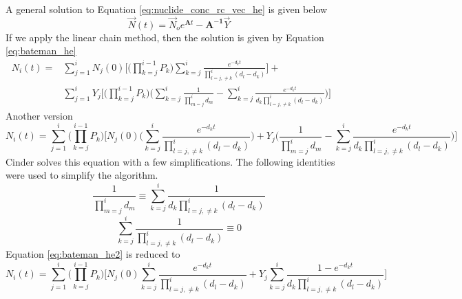 A general solution to Equation \ref{eq:nuclide_conc_rc_vec_he} is given below
\begin{equation}\label{eq:rate_change_sol_he}
  \vec{N}(t) =\vec{N}_{o} e^{\boldsymbol{A}t }- \boldsymbol{A^{-1}} \vec{Y}
\end{equation}
If we apply the linear chain method, then the solution is given by Equation
\ref{eq:bateman_he}
\begin{equation}\label{eq:bateman_he}
  \begin{aligned}
  N_{i}(t) = &\sum_{j=1}^{i} N_{j}(0)
  \Bigg[ \Bigg( \prod_{k=j}^{i-1} P_{k} \Bigg)
  \sum_{k=j}^{i}\frac{e^{-d_{k}t}}{\displaystyle \prod_{l=j, \neq k}^{i}
  (d_{l} -d_{k})}
  \Bigg] + &&\\
  &\sum_{j=1}^{i} Y_{j} \Bigg[ \Bigg(\prod_{k=j}^{i-1} P_{k} \Bigg)
  \Bigg(\sum_{k=j}^{i} \frac{1}{\displaystyle \prod_{m=j}^{i} d_{m}} -
  \sum_{k=j}^{i} \frac{e^{-d_{k}t}}{d_{k} \displaystyle \prod_{l=j, \neq k}^{i}(d_{l} -d_{k})}
  \Bigg)\Bigg]
  \end{aligned}
\end{equation}
Another version
\begin{equation}\label{eq:bateman_he_2}
  N_{i}(t) = \sum_{j=1}^{i}
  \Bigg( \prod_{k=j}^{i-1} P_{k} \Bigg)
  \Bigg[ N_{j}(0) \Bigg(\sum_{k=j}^{i}\frac{e^{-d_{k}t}}{\displaystyle
  \prod_{l=j, \neq k}^{i}(d_{l} -d_{k})}
  \Bigg) + Y_{j}
  \Bigg( \frac{1}{\displaystyle \prod_{m=j}^{i} d_{m}} -
  \sum_{k=j}^{i} \frac{e^{-d_{k}t}}{d_{k}
  \displaystyle \prod_{l=j, \neq k}^{i}(d_{l} -d_{k})}
  \Bigg)\Bigg]
\end{equation}
Cinder solves this equation with a few simplifications. The following identities were used to
simplify the algorithm.
\begin{equation}\label{eq:simplification1}
  \frac{1}{\displaystyle \prod_{m=j}^{i} d_{m}} \equiv
  \sum_{k=j}^{i} \frac{1}{d_{k}
  \displaystyle \prod_{ l=j, \neq k}^{i}(d_{l} -d_{k})}
\end{equation}
\begin{equation}\label{eq:simplification2}
  \sum_{k=j}^{i} \frac{1}{
  \displaystyle \prod_{l=j, \neq k}^{i}(d_{l} -d_{k})} \equiv 0
\end{equation}
Equation \ref{eq:bateman_he2} is reduced to
\begin{equation}\label{eq:bateman_he_simp}
  N_{i}(t) = \sum_{j=1}^{i}
  \Bigg( \prod_{k=j}^{i-1} P_{k} \Bigg)
  \Bigg[ N_{j}(0) \sum_{k=j}^{i}\frac{e^{-d_{k}t}}{\displaystyle
  \prod_{l=j, \neq k}^{i}(d_{l} -d_{k})}
  + Y_{j}
  \sum_{k=j}^{i} \frac{1 - e^{-d_{k}t}}{d_{k}
  \displaystyle \prod_{l=j, \neq k}^{i}(d_{l} -d_{k})}
  \Bigg]
\end{equation}
